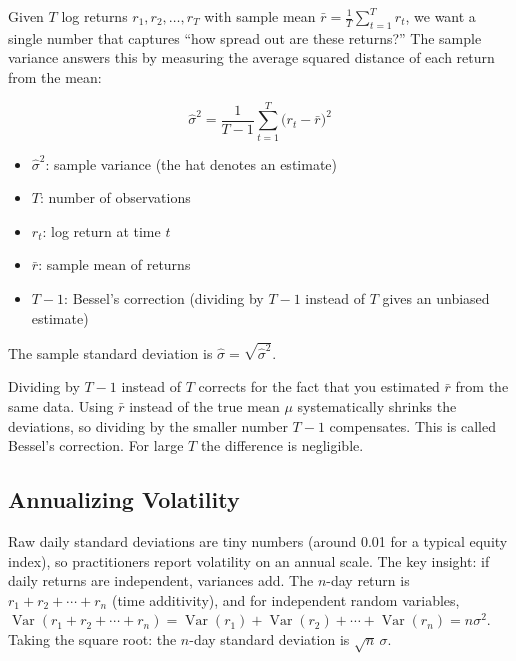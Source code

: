 \begin{definition}
Given $T$ log returns $r_1, r_2, \ldots, r_T$ with sample mean $\bar{r} = \frac{1}{T}\sum_{t=1}^T r_t$, we want a single number that captures ``how spread out are these returns?''
The sample variance answers this by measuring the average squared distance of each return from the mean:

\begin{equation}
  \hat{\sigma}^2 = \frac{1}{T-1}\sum_{t=1}^{T}\bigl(r_t - \bar{r}\bigr)^2
  \label{eq:sample-variance}
\end{equation}
\begin{itemize}[nosep]
  \item $\hat{\sigma}^2$: sample variance (the hat denotes an estimate)
  \item $T$: number of observations
  \item $r_t$: log return at time $t$
  \item $\bar{r}$: sample mean of returns
  \item $T-1$: Bessel's correction (dividing by $T-1$ instead of $T$ gives an unbiased estimate)
\end{itemize}

The sample standard deviation is $\hat{\sigma} = \sqrt{\hat{\sigma}^2}$.
\end{definition}

\begin{prereq}[Why $T-1$?]
Dividing by $T-1$ instead of $T$ corrects for the fact that you estimated $\bar{r}$ from the same data.
Using $\bar{r}$ instead of the true mean $\mu$ systematically shrinks the deviations, so dividing by the smaller number $T-1$ compensates.
This is called Bessel's correction.
For large $T$ the difference is negligible.
\end{prereq}

\subsection{Annualizing Volatility}
\label{sec:annualizing}

Raw daily standard deviations are tiny numbers (around 0.01 for a typical equity index), so practitioners report volatility on an annual scale.
The key insight: if daily returns are independent, variances add.
The $n$-day return is $r_1 + r_2 + \cdots + r_n$ (time additivity), and for independent random variables, $\operatorname{Var}(r_1 + r_2 + \cdots + r_n) = \operatorname{Var}(r_1) + \operatorname{Var}(r_2) + \cdots + \operatorname{Var}(r_n) = n\sigma^2$.
Taking the square root: the $n$-day standard deviation is $\sqrt{n}\,\sigma$.


